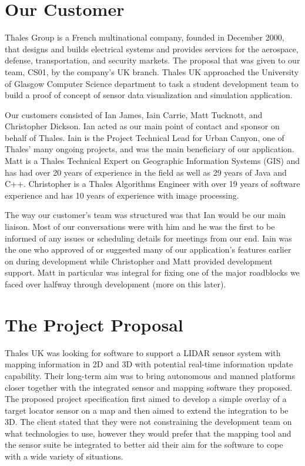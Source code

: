 \documentclass{l3proj}
\begin{document}
\section{Our Customer}

Thales Group is a French multinational company, founded in December 2000, that designs and builds electrical systems and provides services for the aerospace, defense, transportation, and security markets.\cite{wikipedia-Thales} The proposal that was given to our team, CS01, by the company’s UK branch. Thales UK approached the University of Glasgow Computer Science department to task a student development team to build a proof of concept of sensor data visualization and simulation application.

Our customers consisted of Ian James, Iain Carrie, Matt Tucknott, and Christopher Dickson. Ian acted as our main point of contact and sponsor on behalf of Thales. Iain is the Project Technical Lead for Urban Canyon, one of Thales’ many ongoing projects, and was the main beneficiary of our application. Matt is a Thales Technical Expert on Geographic Information Systems (GIS)  and has had over 20 years of experience in the field as well as 29 years of Java and C++. Christopher is a Thales Algorithms Engineer with over 19 years of software experience and has 10 years of experience with image processing.

The way our customer’s team was structured was that Ian would be our main liaison. Most of our conversations were with him and he was the first to be informed of any issues or scheduling details for meetings from our end. Iain was the one who approved of or suggested many of our application’s features earlier on during development while Christopher and Matt provided development support. Matt in particular was integral for fixing one of the major roadblocks we faced over halfway through development (more on this later). 

\section{The Project Proposal}

Thales UK was looking for software to support a LIDAR sensor system with mapping information in 2D and 3D with potential real-time information update capability. Their long-term aim was to bring autonomous and manned platforms closer together with the integrated sensor and mapping software they proposed. The proposed project specification first aimed to develop a simple overlay of a target locator sensor on a map and then aimed to extend the integration to be 3D. The client stated that they were not constraining the development team on what technologies to use, however they would prefer that the mapping tool and the sensor suite be integrated to better aid their aim for the software to cope with a wide variety of situations.
\end{document}
